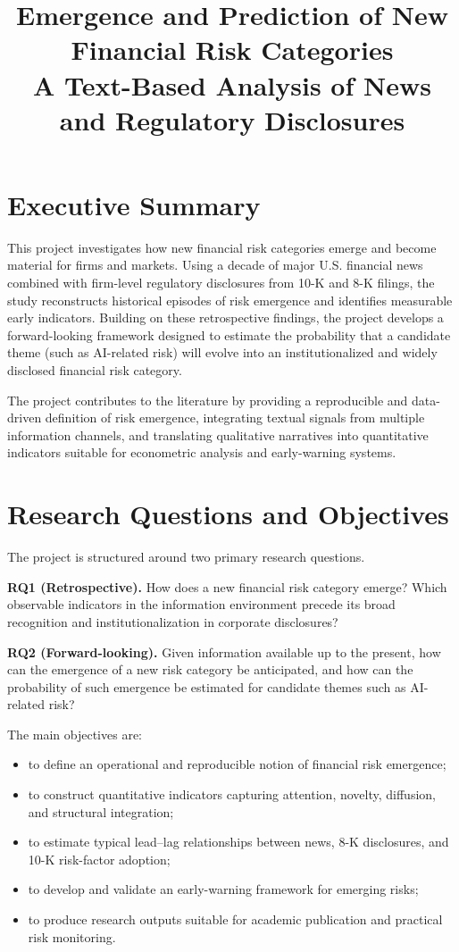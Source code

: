 \documentclass[11pt,a4paper]{article}
\title{\textbf{Emergence and Prediction of New Financial Risk Categories}\\
\vspace{0.3cm}
\large A Text-Based Analysis of News and Regulatory Disclosures}
\author{}
\date{}
\begin{document}
\maketitle

\section*{Executive Summary}

This project investigates how new financial risk categories emerge and become material for firms and markets. Using a decade of major U.S. financial news combined with firm-level regulatory disclosures from 10-K and 8-K filings, the study reconstructs historical episodes of risk emergence and identifies measurable early indicators. Building on these retrospective findings, the project develops a forward-looking framework designed to estimate the probability that a candidate theme (such as AI-related risk) will evolve into an institutionalized and widely disclosed financial risk category.

The project contributes to the literature by providing a reproducible and data-driven definition of risk emergence, integrating textual signals from multiple information channels, and translating qualitative narratives into quantitative indicators suitable for econometric analysis and early-warning systems.

\section{Research Questions and Objectives}

The project is structured around two primary research questions.

\textbf{RQ1 (Retrospective).} How does a new financial risk category emerge? Which observable indicators in the information environment precede its broad recognition and institutionalization in corporate disclosures?

\textbf{RQ2 (Forward-looking).} Given information available up to the present, how can the emergence of a new risk category be anticipated, and how can the probability of such emergence be estimated for candidate themes such as AI-related risk?

The main objectives are:
\begin{itemize}
    \item to define an operational and reproducible notion of financial risk emergence;
    \item to construct quantitative indicators capturing attention, novelty, diffusion, and structural integration;
    \item to estimate typical lead--lag relationships between news, 8-K disclosures, and 10-K risk-factor adoption;
    \item to develop and validate an early-warning framework for emerging risks;
    \item to produce research outputs suitable for academic publication and practical risk monitoring.
\end{itemize}
\end{document}
